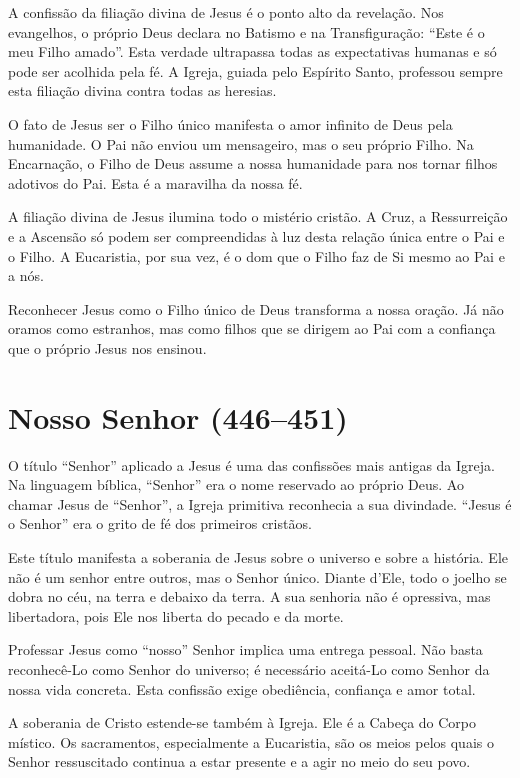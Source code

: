 A confissão da filiação divina de Jesus é o ponto alto da revelação. Nos evangelhos, o próprio Deus declara no Batismo e na Transfiguração: ``Este é o meu Filho amado''. Esta verdade ultrapassa todas as expectativas humanas e só pode ser acolhida pela fé. A Igreja, guiada pelo Espírito Santo, professou sempre esta filiação divina contra todas as heresias.

O fato de Jesus ser o Filho único manifesta o amor infinito de Deus pela humanidade. O Pai não enviou um mensageiro, mas o seu próprio Filho. Na Encarnação, o Filho de Deus assume a nossa humanidade para nos tornar filhos adotivos do Pai. Esta é a maravilha da nossa fé.

A filiação divina de Jesus ilumina todo o mistério cristão. A Cruz, a Ressurreição e a Ascensão só podem ser compreendidas à luz desta relação única entre o Pai e o Filho. A Eucaristia, por sua vez, é o dom que o Filho faz de Si mesmo ao Pai e a nós.

Reconhecer Jesus como o Filho único de Deus transforma a nossa oração. Já não oramos como estranhos, mas como filhos que se dirigem ao Pai com a confiança que o próprio Jesus nos ensinou.

\section{Nosso Senhor (446--451)}

O título ``Senhor'' aplicado a Jesus é uma das confissões mais antigas da Igreja. Na linguagem bíblica, ``Senhor'' era o nome reservado ao próprio Deus. Ao chamar Jesus de ``Senhor'', a Igreja primitiva reconhecia a sua divindade. ``Jesus é o Senhor'' era o grito de fé dos primeiros cristãos.

Este título manifesta a soberania de Jesus sobre o universo e sobre a história. Ele não é um senhor entre outros, mas o Senhor único. Diante d’Ele, todo o joelho se dobra no céu, na terra e debaixo da terra. A sua senhoria não é opressiva, mas libertadora, pois Ele nos liberta do pecado e da morte.

Professar Jesus como ``nosso'' Senhor implica uma entrega pessoal. Não basta reconhecê-Lo como Senhor do universo; é necessário aceitá-Lo como Senhor da nossa vida concreta. Esta confissão exige obediência, confiança e amor total.

A soberania de Cristo estende-se também à Igreja. Ele é a Cabeça do Corpo místico. Os sacramentos, especialmente a Eucaristia, são os meios pelos quais o Senhor ressuscitado continua a estar presente e a agir no meio do seu povo.

